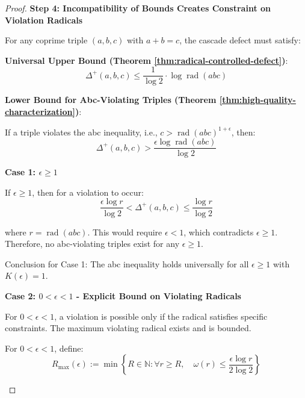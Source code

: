 \begin{proof}
\noindent \textbf{Step 4: Incompatibility of Bounds Creates Constraint on Violation Radicals}

For any coprime triple $(a,b,c)$ with $a+b=c$, the cascade defect must satisfy:

\noindent \textbf{Universal Upper Bound (Theorem \ref{thm:radical-controlled-defect})}:
\begin{equation}
\label{eq:defect-upper-universal}
\Delta^{+}(a,b,c) \leq \frac{1}{\log 2} \cdot \log \operatorname{rad}(abc)
\end{equation}

\noindent \textbf{Lower Bound for Abc-Violating Triples (Theorem \ref{thm:high-quality-characterization})}:

If a triple violates the abc inequality, i.e., $c > \operatorname{rad}(abc)^{1+\epsilon}$, then:
\begin{equation}
\label{eq:defect-lower-violating}
\Delta^{+}(a,b,c) > \frac{\epsilon \log \operatorname{rad}(abc)}{\log 2}
\end{equation}

\noindent \textbf{Case 1: $\epsilon \geq 1$}

If $\epsilon \geq 1$, then for a violation to occur:
\begin{equation}
\frac{\epsilon \log r}{\log 2} < \Delta^{+}(a,b,c) \leq \frac{\log r}{\log 2}
\end{equation}

where $r = \operatorname{rad}(abc)$. This would require $\epsilon < 1$, which contradicts $\epsilon \geq 1$. Therefore, no abc-violating triples exist for any $\epsilon \geq 1$.

Conclusion for Case 1: The abc inequality holds universally for all $\epsilon \geq 1$ with $K(\epsilon) = 1$.

\noindent \textbf{Case 2: $0 < \epsilon < 1$ - Explicit Bound on Violating Radicals}

For $0 < \epsilon < 1$, a violation is possible only if the radical satisfies specific constraints. The maximum violating radical exists and is bounded.

\begin{theorem}
\label{thm:rmax-epsilon-bound}

For $0 < \epsilon < 1$, define:
\begin{equation}
R_{\max}(\epsilon) := \min\left\{R \in \mathbb{N} : \forall r \geq R, \quad \omega(r) \leq \frac{\epsilon \log r}{2 \log 2}\right\}
\end{equation}


\end{theorem}
\end{proof}

